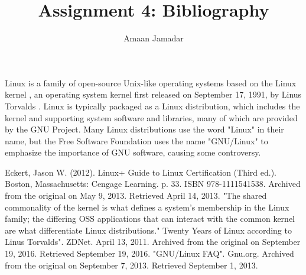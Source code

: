 \documentclass[a4paper,10pt]{article}
\title{Assignment 4: Bibliography}
\author{Amaan Jamadar}
\begin{document}
\maketitle
\newpage

Linux is a family of open-source Unix-like operating systems based on the Linux kernel \cite{kernel}, an operating system kernel first released on September 17, 1991, by Linus Torvalds \cite{linus}. Linux is typically packaged as a Linux distribution, which includes the kernel and supporting system software and libraries, many of which are provided by the GNU Project. Many Linux distributions use the word "Linux" in their name, but the Free Software Foundation uses the name "GNU/Linux" to emphasize the importance of GNU software, causing some controversy. \cite{gnu}

\medskip

\begin{thebibliography}{}
Eckert, Jason W. (2012). Linux+ Guide to Linux Certification (Third ed.). Boston, Massachusetts: Cengage Learning. p. 33. ISBN 978-1111541538. Archived from the original on May 9, 2013. Retrieved April 14, 2013. "The shared commonality of the kernel is what defines a system's membership in the Linux family; the differing OSS applications that can interact with the common kernel are what differentiate Linux distributions."
Twenty Years of Linux according to Linus Torvalds". ZDNet. April 13, 2011. Archived from the original on September 19, 2016. Retrieved September 19, 2016.
 "GNU/Linux FAQ". Gnu.org. Archived from the original on September 7, 2013. Retrieved September 1, 2013.
\end{thebibliography}
\end{document}
